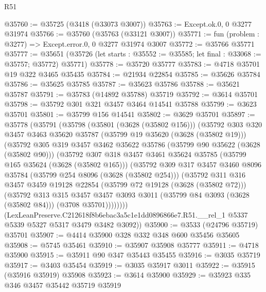 \begin{lexlean}{R51}
\begin{coremodule}
@35760 := @35725 (@3418 (@33073 @3007))
@35763 := Except.ok.{0, 0} @3277 @31974
@35766 := @35760 (@35763 (@33121 @3007))
@35771 := fun (problem : @3277) => Except.error.{0, 0} @3277 @31974 @3007
@35772 := @35766 @35771
@35777 := @35651
    (@35726 (let starts : @35552 := @35585; let final : @33068 := @35757; @35772) @35771)
@35778 := @35720 @35777
@35783 := @4718 @35701 @19 @322 @3465 @35435
@35784 := @21934 @22854
@35785 := @35626 @35784
@35786 := @35625 @35785
@35787 := @35623 @35786
@35788 := @35621 @35787
@35791 := @35783 (@14892 @35788) @35719
@35792 := @3614 @35701
@35798 := @35792 @301 @321 @3457 @3464 @14541 @35788
@35799 := @3623 @35701
@35801 := @35799 @156 @14541
@35802 := @3629 @35701
@35897 := @35778
    (@35791
      (@35798
        (@35801 (@3628 (@35802 @156)))
        (@35792
          @303
          @320
          @3457
          @3463
          @35620
          @35787
          (@35799 @19 @35620 (@3628 (@35802 @19)))
          (@35792
            @305
            @319
            @3457
            @3462
            @35622
            @35786
            (@35799 @90 @35622 (@3628 (@35802 @90)))
            (@35792
              @307
              @318
              @3457
              @3461
              @35624
              @35785
              (@35799 @165 @35624 (@3628 (@35802 @165)))
              (@35792
                @309
                @317
                @3457
                @3460
                @8096
                @35784
                (@35799 @254 @8096 (@3628 (@35802 @254)))
                (@35792
                  @311
                  @316
                  @3457
                  @3459
                  @19128
                  @22854
                  (@35799 @72 @19128 (@3628 (@35802 @72)))
                  (@35792
                    @313
                    @315
                    @3457
                    @3457
                    @3093
                    @3011
                    (@35799 @84 @3093 (@3628 (@35802 @84)))
                    (@3708 @35701))))))))
      (LexLeanPreserve.C212618f8b6ebac3a5c1e1dd0896866e7.R51.__rel_1
        @5337
        @5339
        @5327
        @5317
        @3479
        @3482
        @3092))
@35900 := @3533 (@24796 @35719) @35701
@35907 := @4414 @35900 @328 @332 @348 @600 @35456 @35605
@35908 := @5745 @35461
@35910 := @35907 @35908 @35777
@35911 := @4718 @35900
@35915 := @35911 @90 @347 @35443 @35455
@35916 := @3035 @35719
@35917 := @3403 @35454
@35919 := @3035 @35917 @3011
@35922 := @35915 (@35916 @35919) @35908
@35923 := @3614 @35900
@35929 := @35923 @335 @346 @3457 @35442 @35719 @35919

\end{coremodule}
\end{lexlean}

